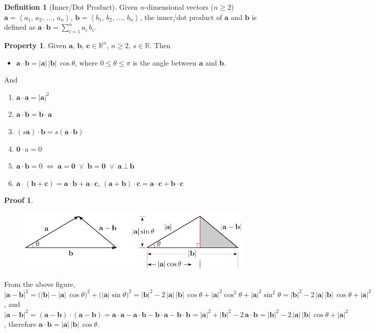 \documentclass[12pt]{extarticle}
\newcommand{\ds}{\displaystyle}
\newcommand{\ifff}{\;\Longleftrightarrow\;}
\newcommand{\llt}{\left\langle}
\newcommand{\rgt}{\right\rangle}
\theoremstyle{definition}
\newtheorem*{dfn}{Definition}
\newtheorem*{prp}{Property}
\newtheorem*{prf}{Proof}
\newcommand{\va}{\mathbf{a}}
\newcommand{\vb}{\mathbf{b}}
\newcommand{\vc}{\mathbf{c}}
\newcommand{\vZero}{\mathbf{0}}
\begin{document}
\begin{dfn}[Inner/Dot Product]
  Given $n$-dimensional vectors ($n\geqslant 2$) $\va = \llt a_1,\,a_2,\,\ldots,\,a_n\rgt$, $\vb = \llt b_1,\,b_2,\,\ldots,\,b_n\rgt$, the inner/dot product of $\va$ and $\vb$ is defined as $\ds\va\cdot\vb = \sum_{i = 1}^n a_i\,b_i$. 
\end{dfn}

\begin{prp} Given $\va$, $\vb$, $\vc\in\mathbb{R}^n$, $n\geqslant 2$, $s\in\mathbb{R}$. Then
  \begin{itemize}\setlength{\itemsep}{0pt}
    \item $\va\cdot\vb = |\va|\,|\vb|\,\cos\theta$, where $0\leqslant\theta\leqslant\pi$ is the angle between $\va$ and $\vb$. 
  \end{itemize}
  And
  \setlength{\columnsep}{-20mm}
  \begin{multicols}{2}
    \begin{enumerate}\setlength{\itemsep}{0pt}
      \item $\va\cdot\va = |\va|^2$
      \item $\va\cdot\vb = \vb\cdot\va$
      \item $(s\va)\cdot\vb = s(\va\cdot\vb)$
      \item $\vZero\cdot a = 0$
      \item $\va\cdot\vb = 0\ifff\va=\vZero\;\vee\;\vb = \vZero\;\vee\;\va\,\bot\,\vb$
      \item $\va\cdot(\vb + \vc) = \va\cdot\vb + \va\cdot\vc$, $(\va + \vb)\cdot\vc = \va\cdot\vc + \vb\cdot\vc$
    \end{enumerate}
  \end{multicols}
\end{prp}

\begin{prf}
  \begin{figure}[!htbp]
    \centering
    \includegraphics[scale=1,page=1]{fig/cosineB.pdf}
  \end{figure}
  From the above figure, $\ds|\va-\vb|^2 = \big(|\vb|-|\va|\,\cos\theta\big)^2 + \big(|\va|\sin\theta\big)^2 = |\vb|^2 - 2\,|\va|\,|\vb|\,\cos\theta + |\va|^2\cos^2\theta + |\va|^2\sin^2\theta = |\vb|^2 - 2\,|\va|\,|\vb|\,\cos\theta + |\va|^2$, and $\ds|\va - \vb|^2 = (\va - \vb)\cdot(\va - \vb) = \va\cdot\va - \va\cdot\vb - \vb\cdot\va - \vb\cdot\vb = |\va|^2 + |\vb|^2 - 2\,\va\cdot\vb = |\vb|^2 - 2\,|\va|\,|\vb|\,\cos\theta + |\va|^2$, therefore $\va\cdot\vb = |\va|\,|\vb|\,\cos\theta$. 
\end{prf}
\end{document}
